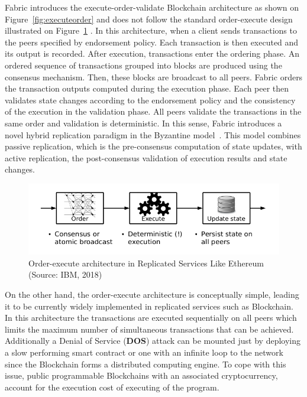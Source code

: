 Fabric introduces the execute-order-validate Blockchain architecture as shown
on Figure~\ref{fig:executeorder} and does not follow the standard order-execute
design illustrated on Figure~\ref{fig:orderexecute} \cite{Androulaki2018}. In
this architecture, when a client sends transactions to the peers specified by
endorsement policy. Each transaction is then executed and its output is
recorded. After execution, transactions enter the ordering phase. An ordered
sequence of transactions grouped into blocks are produced using the consensus
mechanism. Then, these blocks are broadcast to all peers. Fabric orders the
transaction outputs computed during the execution phase. Each peer then
validates state changes according to the endorsement policy and the consistency
of the execution in the validation phase. All peers validate the transactions
in the same order and validation is deterministic. In this sense, Fabric
introduces a novel hybrid replication paradigm in the Byzantine
model~\cite{Androulaki2018}. This model combines passive replication, which is
the pre-consensus computation of state updates, with active replication, the
post-consensus validation of execution results and state changes.

\begin{figure}[h]
  \centering
  \includegraphics[width=0.8\linewidth]{imgs/orderExecuteArchitecture.png}
  \caption{\label{fig:orderexecute} Order-execute architecture in Replicated
  Services Like Ethereum (Source: IBM, 2018)}
\end{figure}

On the other hand, the order-execute architecture is conceptually simple,
leading it to be currently widely implemented in replicated services such as
Blockchain. In this architecture the transactions are executed sequentially on
all peers which limits the maximum number of simultaneous transactions that can
be achieved.  Additionally a Denial of Service (\textbf{DOS}) attack can be
mounted just by deploying a slow performing smart contract or one with an
infinite loop to the network since the Blockchain forms a distributed computing
engine.  To cope with this issue, public programmable Blockchains with an
associated cryptocurrency, account for the execution cost of executing of the
program.

